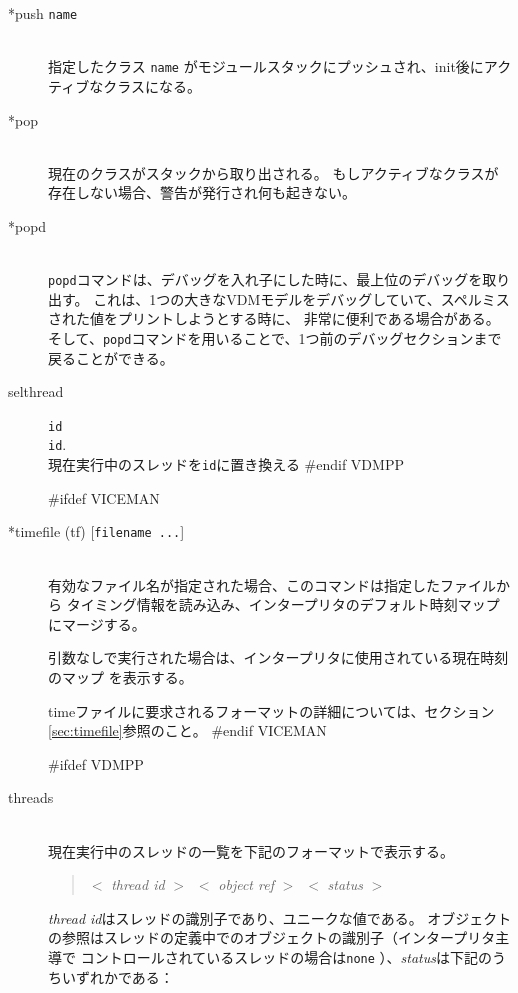 \documentclass[\pformat,12pt]{article}
\begin{document}
\begin{description}
\item[*push {\tt name}] \mbox{}\\
  指定したクラス {\tt name} がモジュールスタックにプッシュされ、init後にアクティブなクラスになる。 

\item[*pop] \mbox{}\\
  現在のクラスがスタックから取り出される。
  もしアクティブなクラスが存在しない場合、警告が発行され何も起きない。
  
\item[*popd] \mbox{}\\
  {\tt popd}コマンドは、デバッグを入れ子にした時に、最上位のデバッグを取り出す。
  これは、1つの大きなVDMモデルをデバッグしていて、スペルミスされた値をプリントしようとする時に、
  非常に便利である場合がある。
  そして、{\tt popd}コマンドを用いることで、1つ前のデバッグセクションまで戻ることができる。

\item[selthread]\texttt{id}\mbox{}\\
  \texttt{id}. \\
  現在実行中のスレッドを\texttt{id}に置き換える
#endif VDMPP

#ifdef VICEMAN
\item[*timefile (tf) \mbox{[{\tt filename ...}]}] \mbox{}\\
  有効なファイル名が指定された場合、このコマンドは指定したファイルから
  タイミング情報を読み込み、インタープリタのデフォルト時刻マップにマージする。

  引数なしで実行された場合は、インタープリタに使用されている現在時刻のマップ
  を表示する。
  
  timeファイルに要求されるフォーマットの詳細については、セクション\ref{sec:timefile}参照のこと。
#endif VICEMAN

#ifdef VDMPP
\item[threads]\mbox{}\\
現在実行中のスレッドの一覧を下記のフォーマットで表示する。
\begin{quote}
  $<$ \textit{thread id} $>$\ $<$ \textit{object ref} $>$\ $<$
\textit{status} $>$
\end{quote}
\textit{thread id}はスレッドの識別子であり、ユニークな値である。
オブジェクトの参照はスレッドの定義中でのオブジェクトの識別子（インタープリタ主導で
コントロールされているスレッドの場合は\texttt{none} ）、\textit{status}は下記のうちいずれかである：


\end{description}
\end{document}
